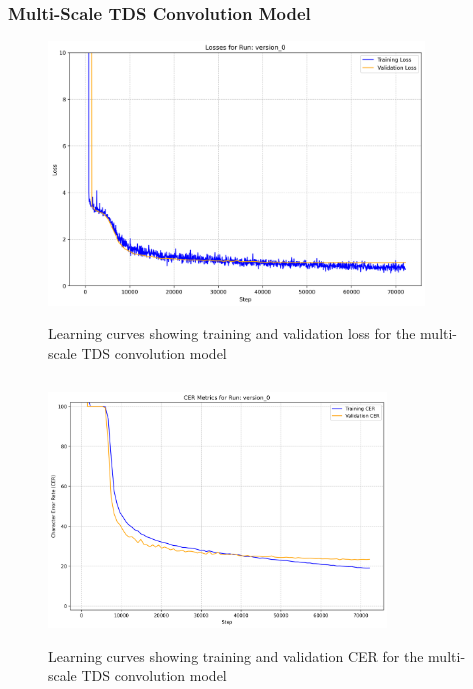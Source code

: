 \subsubsection{Multi-Scale TDS Convolution Model}
\begin{figure}[h]
    \centering
    \begin{minipage}{0.48\textwidth}
        \centering
        \includegraphics[height=7cm,width=\textwidth]{../results/model-multi-scale-tiny/model-multi-scale-tiny_loss.png}
        \caption{Learning curves showing training and validation loss for the multi-scale TDS convolution model}
        \label{fig:multi_scale_loss}
    \end{minipage}
    \hfill
    \begin{minipage}{0.48\textwidth}
        \centering
        \includegraphics[height=7cm, width=0.8\textwidth]{../results/model-multi-scale-tiny/model-multi-scale-tiny_cer.png}
        \caption{Learning curves showing training and validation CER for the multi-scale TDS convolution model}
        \label{fig:multi_scale_cer}
    \end{minipage}
\end{figure}

